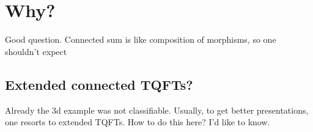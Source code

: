 \documentclass[a4paper]{article}
\begin{document}
\section{Why?}

Good question.
Connected sum is like composition of morphisms, so one shouldn't expect

\subsection{Extended connected TQFTs?}

Already the 3d example was not classifiable.
Usually, to get better presentations, one resorts to extended TQFTs.
How to do this here?
I'd like to know.

\end{document}

